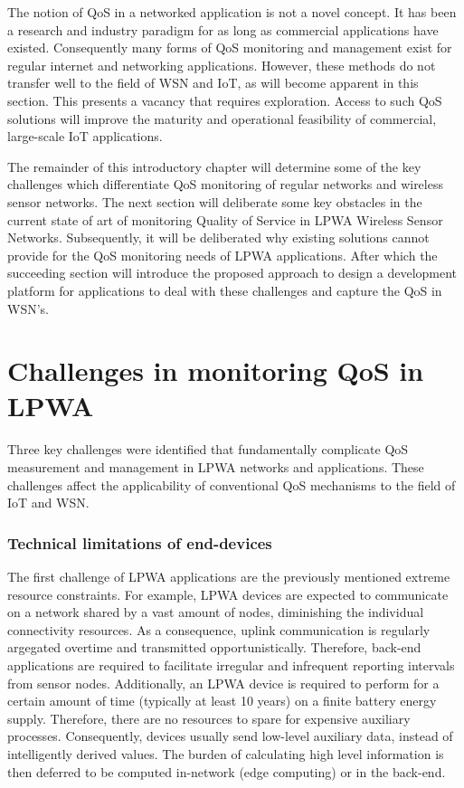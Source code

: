 The notion of QoS in a networked application is not a novel concept. It has been a research and industry paradigm for as long as commercial applications have existed. Consequently many forms of QoS monitoring and management exist for regular internet and networking applications. However, these methods do not transfer well to the field of WSN and IoT, as will become apparent in this section. This presents a vacancy that requires exploration. Access to such QoS solutions will improve the maturity and operational feasibility of commercial, large-scale IoT applications.

The remainder of this introductory chapter will determine some of the key challenges which differentiate QoS monitoring of regular networks and wireless sensor networks. The next section will deliberate some key obstacles in the current state of art of monitoring Quality of Service in LPWA Wireless Sensor Networks. Subsequently, it will be deliberated why existing solutions cannot provide for the QoS monitoring  needs of LPWA applications. After which the succeeding section will introduce the proposed approach to design a development platform for applications to deal with these challenges and capture the QoS in WSN's.


\section{Challenges in monitoring QoS in LPWA}
\label{sec:challenges}
Three key challenges were identified that fundamentally complicate QoS measurement and management in LPWA networks and applications. These challenges affect the applicability of conventional QoS mechanisms to the field of IoT and WSN. %

\subsubsection{Technical limitations of end-devices}
The first challenge of LPWA applications are the previously mentioned extreme resource constraints. For example, LPWA devices are expected to communicate on a network shared by a vast amount of nodes, diminishing the individual connectivity resources. As a consequence, uplink communication is regularly argegated overtime and transmitted opportunistically. Therefore, back-end applications are required to facilitate irregular and infrequent reporting intervals from sensor nodes. Additionally, an LPWA device is required to perform for a certain amount of time (typically at least 10 years\cite{tmobile, vodafone}) on a finite battery energy supply. Therefore, there are no resources to spare for expensive auxiliary processes. Consequently, devices usually send low-level auxiliary data, instead of intelligently derived values. The burden of calculating high level information is then deferred to be computed in-network (edge computing) or in the back-end. 

